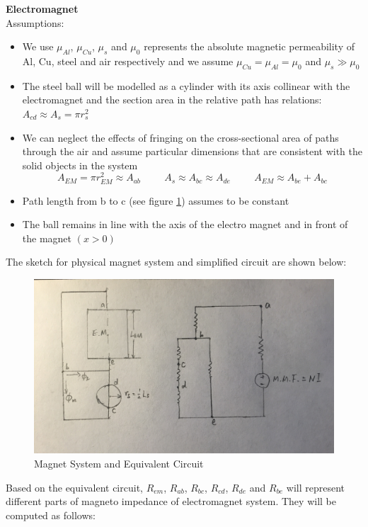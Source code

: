 \documentclass[letterpaper]{article}
\begin{document}
\textbf{\large{Electromagnet}}\\
Assumptions:
\begin{itemize}
	\item We use $\mu_{Al}$, $\mu_{Cu}$, $\mu_s$ and $\mu_0$ represents the absolute magnetic permeability of Al, Cu, steel and air respectively and we assume $\mu_{Cu}=\mu_{Al}=\mu_{0}$ and $\mu_s \gg \mu_0$
	\item The steel ball will be modelled as a cylinder with its axis collinear with the electromagnet and the section area in the relative path has relations: $A_{cd} \approx A_{s} = \pi  r_{s}^2 $
	\item We can neglect the effects of fringing on the cross-sectional area of paths through the air and assume particular dimensions that are consistent with the solid objects in the system \\
$$ A_{EM} = \pi r_{EM}^2 \approx A_{ab} \hspace{1cm} A_{s} \approx A_{bc} \approx A_{de} \hspace{1cm} A_{EM} \approx A_{be} + A_{bc} $$ 
	\item Path length from b to c (see figure \ref{fig:Q1_a2}) assumes to be constant
	\item The ball remains in line with the axis of the electro magnet and in front of the magnet $( x > 0 )$
\end{itemize}
The sketch for physical magnet system and simplified circuit are shown below:
\begin{figure}[H]
	\centering
	\includegraphics[scale=0.1]{magnet.jpeg}
	\caption{Magnet System and Equivalent Circuit}
	\label{fig:Q1_a2}
\end{figure}
Based on the equivalent circuit, $R_{em}$, $R_{ab}$, $R_{bc}$, $R_{cd}$, $R_{de}$ and $R_{be}$ will represent different parts of magneto impedance of electromagnet system. They will be computed as follows:
\end{document}
